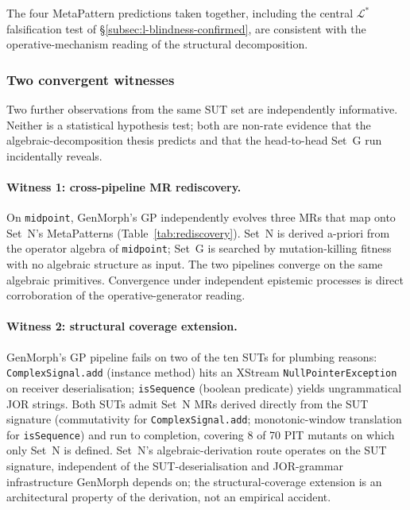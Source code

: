 \documentclass[acmsmall,screen,review]{acmart}
\begin{document}
The four MetaPattern predictions taken together, including the central
$\mathcal{L}^{*}$ falsification test of
\S\ref{subsec:l-blindness-confirmed}, are consistent with the
operative-mechanism reading of the structural decomposition.

\subsubsection{Two convergent witnesses}
\label{subsec:convergent-witnesses}

Two further observations from the same SUT set are independently
informative. Neither is a statistical hypothesis test; both are
non-rate evidence that the algebraic-decomposition thesis predicts
and that the head-to-head Set~G run incidentally reveals.

\paragraph{Witness 1: cross-pipeline MR rediscovery.}
On \texttt{midpoint}, GenMorph's GP independently evolves three MRs
that map onto Set~N's MetaPatterns (Table~\ref{tab:rediscovery}). Set~N is
derived a-priori from the operator algebra of \texttt{midpoint};
Set~G is searched by mutation-killing fitness with no algebraic
structure as input. The two pipelines converge on the same algebraic
primitives. Convergence under independent epistemic processes is
direct corroboration of the operative-generator reading.

\paragraph{Witness 2: structural coverage extension.}
GenMorph's GP pipeline fails on two of the ten SUTs for plumbing reasons: \texttt{ComplexSignal.add} (instance method) hits an XStream \texttt{NullPointerException} on receiver deserialisation; \texttt{isSequence} (boolean predicate) yields ungrammatical JOR strings. Both SUTs admit Set~N MRs derived directly from the SUT signature (commutativity for \texttt{ComplexSignal.add}; monotonic-window translation for \texttt{isSequence}) and run to completion, covering 8 of 70 PIT mutants on which only Set~N is defined. Set~N's algebraic-derivation route operates on the SUT signature, independent of the SUT-deserialisation and JOR-grammar infrastructure GenMorph depends on; the structural-coverage extension is an architectural property of the derivation, not an empirical accident.
\end{document}
